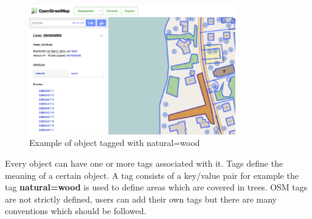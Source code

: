 \begin{figure}[H]
\centering
\includegraphics[width=0.8\textwidth]{images/osm_data_model}
\caption{Example of object tagged with natural=wood}
\end{figure}

Every object can have one or more tags associated with it. Tags define the meaning of a certain object. A tag consists of a key/value pair for example the tag \textbf{natural=wood} is used to define areas which are covered in trees. OSM tags are not strictly defined, users can add their own tags but there are many conventions which should be followed.